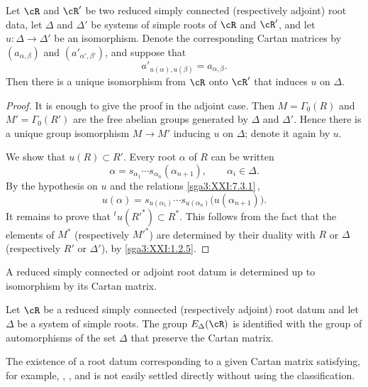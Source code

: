 \begin{proposition}\label{sga3:XXI:7.3.2}
Let \(\cR\) and \(\cR'\) be two reduced simply connected
(respectively adjoint) root data, let \(\Delta\) and \(\Delta'\)
be systems of simple roots of \(\cR\) and \(\cR'\), and let
\(u:\Delta\to\Delta'\) be an isomorphism.  Denote the corresponding
Cartan matrices by \((a_{\alpha,\beta})\) and
\((a'_{\alpha',\beta'})\), and suppose that
\[
 a'_{u(\alpha),u(\beta)}=a_{\alpha,\beta}.
\]
Then there is a unique isomorphism from \(\cR\) onto \(\cR'\)
that induces \(u\) on \(\Delta\).
\end{proposition}

\begin{proof}
It is enough to give the proof in the adjoint case.  Then
\(M=\Gamma_0(R)\) and \(M'=\Gamma_0(R')\) are the free abelian
groups generated by \(\Delta\) and \(\Delta'\).  Hence there is a
unique group isomorphism \(M\to M'\) inducing \(u\) on \(\Delta\);
denote it again by \(u\).

We show that \(u(R)\subset R'\).  Every root \(\alpha\) of \(R\)
can be written
\[
 \alpha=s_{\alpha_1}\cdots s_{\alpha_n}(\alpha_{n+1}),
 \qquad \alpha_i\in\Delta.
\]
By the hypothesis on \(u\) and the relations
\ref{sga3:XXI:7.3.1}\,,
\[
 u(\alpha)=
 s_{u(\alpha_1)}\cdots s_{u(\alpha_n)}
 \bigl(u(\alpha_{n+1})\bigr).
\]
It remains to prove that \({}^tu(R'^\ast)\subset R^\ast\).  This
follows from the fact that the elements of \(M^\ast\)
(respectively \(M'^\ast\)) are determined by their duality with
\(R\) or \(\Delta\) (respectively \(R'\) or \(\Delta'\)), by
\ref{sga3:XXI:1.2.5}.
\end{proof}

\begin{corollary}\label{sga3:XXI:7.3.3}
A reduced simply connected or adjoint root datum is determined up
to isomorphism by its Cartan matrix.
\end{corollary}

\begin{corollary}\label{sga3:XXI:7.3.4}
Let \(\cR\) be a reduced simply connected (respectively adjoint)
root datum and let \(\Delta\) be a system of simple roots.  The
group \(E_\Delta(\cR)\) is identified with the group of
automorphisms of the set \(\Delta\) that preserve the Cartan
matrix.
\end{corollary}

\begin{remark}\label{sga3:XXI:7.3.5}
The existence of a root datum corresponding to a given Cartan
matrix satisfying, for example, , , and  is not easily
settled directly without using the classification.
\end{remark}
